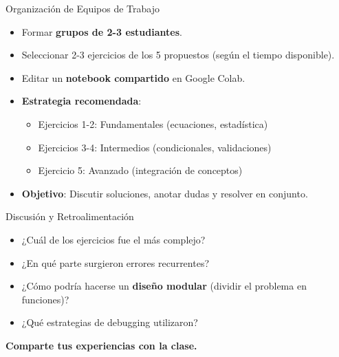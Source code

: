 \documentclass[10pt]{beamer}
\begin{document}
\begin{frame}{Organización de Equipos de Trabajo}
  \begin{itemize}
    \item Formar \textbf{grupos de 2-3 estudiantes}.
    \item Seleccionar 2-3 ejercicios de los 5 propuestos (según el tiempo disponible).
    \item Editar un \textbf{notebook compartido} en Google Colab.
    \item \textbf{Estrategia recomendada}:
      \begin{itemize}
        \item Ejercicios 1-2: Fundamentales (ecuaciones, estadística)
        \item Ejercicios 3-4: Intermedios (condicionales, validaciones)
        \item Ejercicio 5: Avanzado (integración de conceptos)
      \end{itemize}
    \item \textbf{Objetivo}: Discutir soluciones, anotar dudas y resolver en conjunto.
  \end{itemize}
\end{frame}

\begin{frame}{Discusión y Retroalimentación}
  \begin{itemize}
    \item ¿Cuál de los ejercicios fue el más complejo?
    \item ¿En qué parte surgieron errores recurrentes?
    \item ¿Cómo podría hacerse un \textbf{diseño modular} (dividir el problema en funciones)?
    \item ¿Qué estrategias de debugging utilizaron?
  \end{itemize}
  \vspace{0.2cm}
  \textbf{Comparte tus experiencias con la clase.}
\end{frame}

\end{document}
